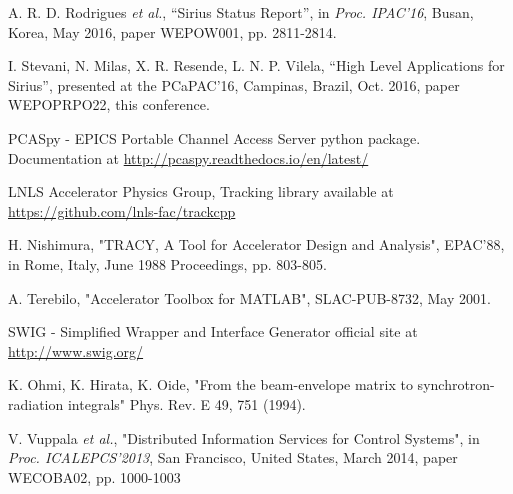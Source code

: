 \documentclass[a4paper,
              ]{jacow}
\begin{document}
\begin{thebibliography}{99}

A. R. D. Rodrigues \emph{et al.},
“Sirius Status Report”,
in \emph{Proc. IPAC'16},
Busan, Korea, May 2016,
paper WEPOW001, pp. 2811-2814.

I. Stevani, N. Milas, X. R. Resende, L. N. P. Vilela,
“High Level Applications for Sirius”,
presented at the PCaPAC'16,
Campinas, Brazil, Oct. 2016,
paper WEPOPRPO22, this conference.

PCASpy - EPICS Portable Channel Access Server python package.
Documentation at \url{http://pcaspy.readthedocs.io/en/latest/}

LNLS Accelerator Physics Group,
Tracking library available at \url{https://github.com/lnls-fac/trackcpp}

H. Nishimura,
"TRACY, A Tool for Accelerator Design and Analysis",
EPAC'88,
in Rome, Italy, June 1988
Proceedings, pp. 803-805.

A. Terebilo,
"Accelerator Toolbox for MATLAB",
SLAC-PUB-8732, May 2001.

SWIG - Simplified Wrapper and Interface Generator
official site at \url{http://www.swig.org/}

K. Ohmi, K. Hirata, K. Oide,
"From the beam-envelope matrix to synchrotron-radiation integrals"
Phys. Rev. E 49, 751 (1994).

  V. Vuppala \emph{et al.},
  "Distributed Information Services for Control Systems",
  in \emph{Proc. ICALEPCS'2013},
  San Francisco, United States, March 2014,
  paper WECOBA02, pp. 1000-1003

\end{thebibliography}
\end{document}
